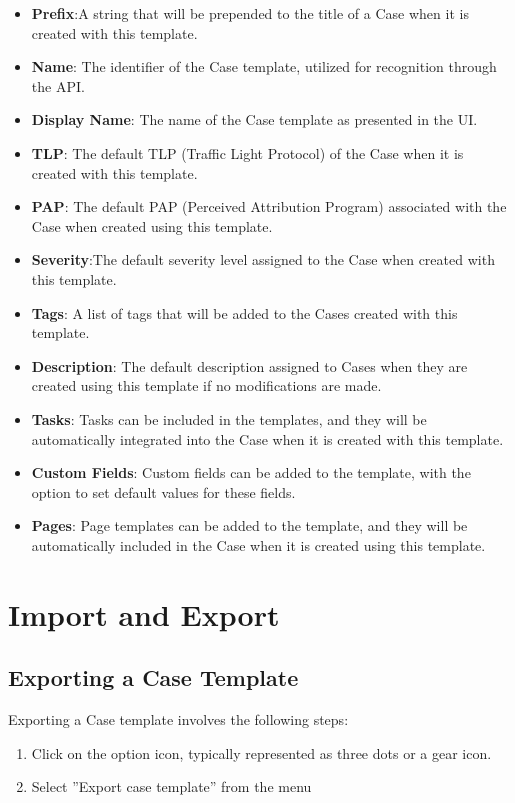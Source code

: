 \documentclass{article}
\begin{document}
\begin{itemize}
  \item \textbf{Prefix}:A string that will be prepended to the title of a Case when it is created with this template.
  \item \textbf{Name}: The identifier of the Case template, utilized for recognition through the API.
  \item \textbf{Display Name}: The name of the Case template as presented in the UI.
  \item \textbf{TLP}: The default TLP (Traffic Light Protocol) of the Case when it is created with this template.
  \item \textbf{PAP}: The default PAP (Perceived Attribution Program) associated with the Case when created using this template.
  \item \textbf{Severity}:The default severity level assigned to the Case when created with this template.
  \item \textbf{Tags}: A list of tags that will be added to the Cases created with this template.
  \item \textbf{Description}: The default description assigned to Cases when they are created using this template if no modifications are made.
  \item \textbf{Tasks}: Tasks can be included in the templates, and they will be automatically integrated into the Case when it is created with this template.
  \item \textbf{Custom Fields}: Custom fields can be added to the template, with the option to set default values for these fields.
  \item \textbf{Pages}: Page templates can be added to the template, and they will be automatically included in the Case when it is created using this template.
\end{itemize}

\section*{Import and Export}

\subsection*{Exporting a Case Template}

Exporting a Case template involves the following steps:

\begin{enumerate}
  \item Click on the option icon, typically represented as three dots or a gear icon.
  \item Select ”Export case template” from the menu
\end{enumerate}
\end{document}
